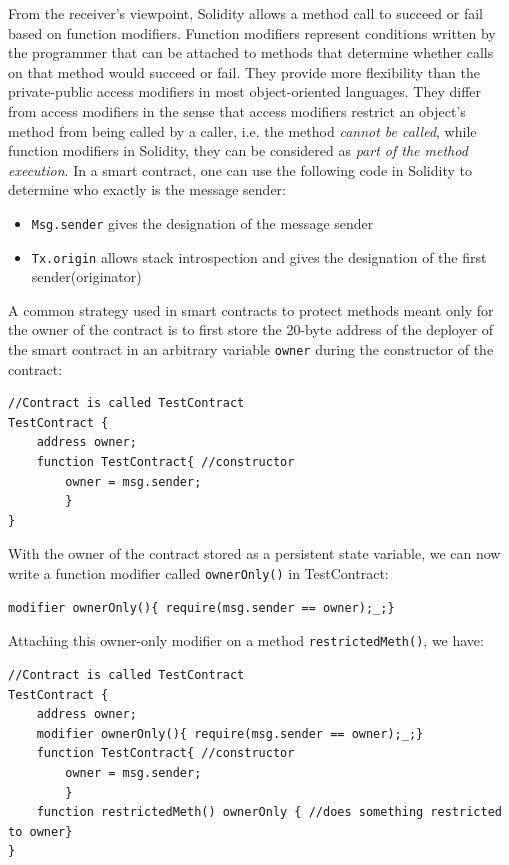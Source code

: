 \documentclass[a4paper,11pt,twoside]{article}
\begin{document}
{From the receiver's viewpoint, Solidity allows a method call to succeed or fail based on function modifiers. Function modifiers represent conditions written by the programmer that can be attached to methods that determine whether calls on that method would succeed or fail. They provide more flexibility than the private-public access modifiers in most object-oriented languages. They differ from access modifiers in the sense that access modifiers restrict an object's method from being called by a caller, i.e. the method \textit{cannot be called}, while function modifiers in Solidity, they can be considered as \textit{part of the method execution}. In a smart contract, one can use the following code in Solidity to determine who exactly is the message sender:
\begin{itemize}
\item \texttt{Msg.sender} gives the designation of the message sender
\item \texttt{Tx.origin} allows stack introspection and gives the designation of the first sender(originator)
\end{itemize}

A common strategy used in smart contracts to protect methods meant only for the owner of the contract is to first store the 20-byte address of the deployer of the smart contract in an arbitrary variable \texttt{owner} during the constructor of the contract:\\

\begin{lstlisting}
//Contract is called TestContract
TestContract {
	address owner;
	function TestContract{ //constructor
		owner = msg.sender;
		}
}
\end{lstlisting}

With the owner of the contract stored as a persistent state variable, we can now write a function modifier called \texttt{ownerOnly()} in TestContract:
\begin{lstlisting}
modifier ownerOnly(){ require(msg.sender == owner);_;}
\end{lstlisting}

Attaching this owner-only modifier on a method \texttt{restrictedMeth()}, we have:

\begin{lstlisting}
//Contract is called TestContract
TestContract {
	address owner;
	modifier ownerOnly(){ require(msg.sender == owner);_;}
	function TestContract{ //constructor
		owner = msg.sender;
		}
	function restrictedMeth() ownerOnly { //does something restricted to owner}
}
\end{lstlisting}

}
\end{document}
